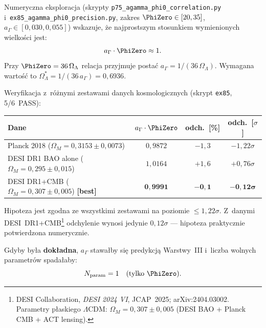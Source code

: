 \begin{hypothesis}[Hipoteza maksymalna: $a_\Gamma = 1/\PhiZero$]%
\label{hyp:agamma-phi0}
Numeryczna eksploracja (skrypty \texttt{p75\_agamma\_phi0\_correlation.py}
i~\texttt{ex85\_agamma\_phi0\_precision.py},
zakres $\PhiZero \in [20,35]$, $a_\Gamma \in [0{,}030, 0{,}055]$)
wskazuje, \.ze najprostszym stosunkiem wymienionych wielko\'sci jest:
\begin{equation}\label{eq:agamma-phi0-conjecture}
  a_\Gamma \cdot \PhiZero \approx 1.
\end{equation}
Przy $\PhiZero = 36\,\Omega_\Lambda$ relacja przyjmuje posta\'c
$a_\Gamma = 1/(36\,\Omega_\Lambda)$.
Wymagana warto\'s\'c to $\Omega_\Lambda^* = 1/(36\,a_\Gamma) = 0{,}6936$.

\medskip
Weryfikacja z~r\'o\.znymi zestawami danych kosmologicznych
(skrypt \texttt{ex85}, 5/6~PASS):
\begin{center}
\begin{tabular}{lccc}
\hline
Dane & $a_\Gamma \cdot \PhiZero$ & odch.\ [\%] & odch.\ [$\sigma$] \\
\hline
Planck 2018 ($\Omega_M=0{,}3153\pm0{,}0073$)         & $0{,}9872$ & $-1{,}3$ & $-1{,}22\sigma$ \\
DESI DR1 BAO alone ($\Omega_M=0{,}295\pm0{,}015$)    & $1{,}0164$ & $+1{,}6$ & $+0{,}76\sigma$ \\
DESI DR1+CMB ($\Omega_M=0{,}307\pm0{,}005$) \textbf{[best]} & $\mathbf{0{,}9991}$ & $\mathbf{-0{,}1}$ & $\mathbf{-0{,}12\sigma}$ \\
\hline
\end{tabular}
\end{center}

Hipoteza jest zgodna ze wszystkimi zestawami na poziomie ${\leq}1{,}22\sigma$.
Z~danymi DESI~DR1+CMB\footnote{DESI Collaboration, \textit{DESI 2024 VI},
  JCAP~2025; arXiv:2404.03002.
  Parametry p\l{}askiego $\Lambda$CDM: $\Omega_M = 0{,}307\pm0{,}005$
  (DESI BAO + Planck CMB + ACT lensing).}
odchylenie wynosi jedynie $0{,}12\sigma$
--- hipoteza praktycznie potwierdzona numerycznie.

Gdyby by\l{}a \textbf{dok\l{}adna}, $a_\Gamma$ stawa\l{}by si\k{e}
predykcj\k{a} Warstwy~III i~liczba wolnych parametr\'ow spada\l{}aby:
\[
  N_{\rm param} = 1 \quad (\text{tylko } \PhiZero).
\]


\end{hypothesis}
